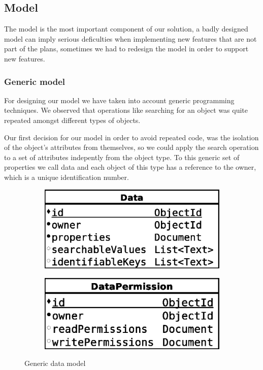 \subsection{Model}
The model is the most important component of our solution, a badly designed model can imply serious deficulties when implementing new features that are not part of the plans, sometimes we had to redesign the model in order to support new features.

\subsubsection {Generic model}

For designing our model we have taken into account generic programming techniques. We observed that operations like searching for an object was quite repeated amongst different types of objects. 

Our first decision for our model in order to avoid repeated code, was the isolation of the object's attributes from themselves, so we could apply the search operation to a set of attributes indepently from the object type. To this generic set of properties we call data and each object of this type has a reference to the owner, which is a unique identification number.

\begin{figure}[H]
    \centering
    \begin{subfigure}[b]{0.4\textwidth}
    	\includegraphics[width=\textwidth]{figures/model_data}
    \end{subfigure}
    \begin{subfigure}[b]{0.4\textwidth}
    	\includegraphics[width=\textwidth]{figures/model_data_permission}
    \end{subfigure}
    \caption{Generic data model}
\end{figure} 

